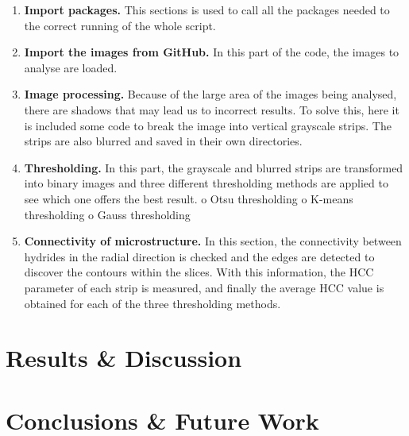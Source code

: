 \documentclass[12pt]{article}
\begin{document}
\begin{enumerate}

    \item \textbf{Import packages.}
This sections is used to  call all the packages needed to the correct running of the whole script.

    \item\textbf{ Import the images from GitHub.}
In this part of the code, the images to analyse are loaded.

    \item \textbf{Image processing.}
Because of the large area of the images being analysed, there are shadows that may lead us to incorrect results. To solve this, here it is included some code to break the image into vertical grayscale strips. The strips are also blurred and saved in their own directories.

    \item \textbf{Thresholding.}
In this part, the grayscale and blurred strips are transformed into binary images and three different thresholding methods are applied to see which one offers the best result.
o	Otsu thresholding
o	K-means thresholding
o	Gauss thresholding

    \item \textbf{Connectivity of microstructure.}
In this section, the connectivity between hydrides in the radial direction is checked and the edges are detected to discover the contours within the slices. With this information, the HCC parameter of each strip is measured, and finally the average HCC value is obtained for each of the three thresholding methods.
\end{enumerate}

\section{Results \& Discussion}


\section{Conclusions \& Future Work}




\newpage
\singlespacing


\end{document}
